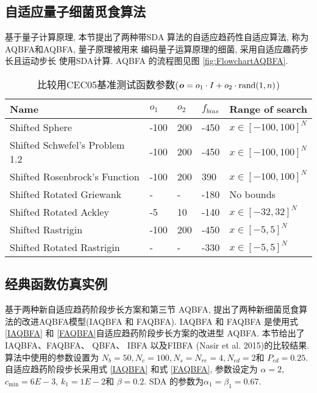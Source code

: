 \subsection{自适应量子细菌觅食算法}
基于量子计算原理, 本节提出了两种带SDA 算法的自适应趋药性自适应算法, 称为 AQBFA和AQBFA, 量子原理被用来 编码量子运算原理的细菌, 采用自适应趣药步长且运动步长 使用SDA计算.
AQBFA 的流程图见图 \ref{fig:FlowchartAQBFA}.
\begin{table}[tb]
\begin{center}
\caption{比较用CEC05基准测试函数参数($\bm o=o_1 \cdot I+o_2\cdot \textup{rand}(1,n)$)}
    \vspace{0.5em}\centering
\begin{tabularx}{0.9\textwidth}{p{6.0cm} p{1.05cm}p{0.75cm}p{1.05cm}p{4.2cm}}
\hline
Name &  $o_1$&  $o_2$&   $f_{bias}$& Range of search\\
\hline
Shifted Sphere &  -100&  200&  -450 &  $x\in [-100,100]^N$\\
Shifted Schwefel's Problem 1.2 &  -100&  200&  -450 &   $x\in [-100,100]^N$\\
Shifted Rosenbrock's Function &  -100&  200&  390 &   $x\in [-100,100]^N$\\
Shifted Rotated Griewank &  -&  -&  -180 &  No bounds\\
Shifted Rotated Ackley&  -5&  10&  -140 &  $x\in [-32,32]^N$\\
Shifted Rastrigin &  -100&  200&  -450 &  $x\in [-5,5]^N$\\
Shifted Rotated  Rastrigin&  -&  -&  -330 &  $x\in [-5,5]^N$\\
\hline
\end{tabularx}
\label{Tab:CEC05ofbias}
\end{center}
\vspace{-0.4cm}
\end{table}
\subsection{经典函数仿真实例}
基于两种新自适应趋药阶段步长方案和第三节 AQBFA, 提出了两种新细菌觅食算法的改进AQBFA模型(IAQBFA 和 FAQBFA). IAQBFA 和 FAQBFA 是使用式 \eqref{IAQBFA} 和 \eqref{FAQBFA}自适应趋药阶段步长方案的改进型 AQBFA. 本节给出了 IAQBFA、FAQBFA、 QBFA、 IBFA 以及FIBFA (Nasir et al. 2015)的比较结果. 算法中使用的参数设置为 $N_b=50, N_c=100, N_s=N_{re}=4, N_{ed}=2$和 $P_{ed}=0.25$. 自适应趋药阶段步长采用式 \eqref{IAQBFA} 和式 \eqref{FAQBFA}, 参数设定为 $\alpha=2$, $c_{\min}=6E-3$, $k_1=1E-2$和 $\beta=0.2$. SDA 的参数为$\alpha_1=\beta_1=0.67$.
